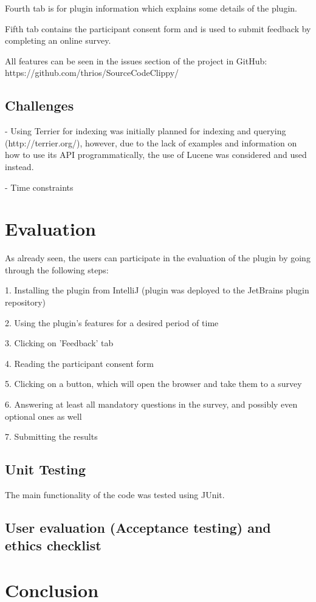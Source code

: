 \documentclass{l4proj}
\begin{document}
Fourth tab is for plugin information which explains some details of the plugin.

Fifth tab contains the participant consent form and is used to submit feedback by completing an online survey.

All features can be seen in the issues section of the project in GitHub: https://github.com/thrios/SourceCodeClippy/


\section{Challenges}
- Using Terrier for indexing was initially planned for indexing and querying (http://terrier.org/), however, due to the lack of examples and information on how to use its API programmatically, the use of Lucene was considered and used instead.

- Time constraints

\chapter{Evaluation}
As already seen, the users can participate in the evaluation of the plugin by going through the following steps:

1. Installing the plugin from IntelliJ (plugin was deployed to the JetBrains plugin repository)

2. Using the plugin's features for a desired period of time

3. Clicking on 'Feedback' tab

4. Reading the participant consent form

5. Clicking on a button, which will open the browser and take them to a survey

6. Answering at least all mandatory questions in the survey, and possibly even optional ones as well

7. Submitting the results

\section{Unit Testing}
The main functionality of the code was tested using JUnit.

\section{User evaluation (Acceptance testing) and ethics checklist}

\chapter{Conclusion}
\end{document}
